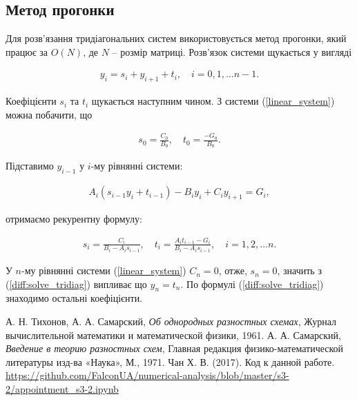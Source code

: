 \subsection{Метод прогонки}

Для розв'язання тридіагональних систем використовується метод прогонки, який працює за \(O(N)\), де \( N \) -- розмір матриці. Розв'язок системи щукається у вигляді

\begin{equation}
\begin{multlined} \label{diff:solve_tridiag}
y_i = s_i + y_{i+1} + t_i, \quad i = 0, 1, \dots n-1.
\end{multlined}
\end{equation}

Коефіцієнти \(s_i\) та \(t_i\) щукається наступним чином. З системи (\ref{linear_system}) можна побачити, що

\begin{equation}
\begin{multlined} 
s_0 = \frac{C_0}{B_0}, \quad t_0 = \frac{-G_0}{B_0}.
\end{multlined}
\end{equation}

Підставимо \( y_{i-1} \) у \(i\)-му рівнянні системи:

\begin{equation}
\begin{multlined} 
A_i\left(s_{i-1}y_i + t_{i-1}\right) - B_i y_i + C_iy_{i+1} = G_i,
\end{multlined}
\end{equation}

отримаємо рекурентну формулу:

\begin{equation}
\begin{multlined} 
s_i = \frac{C_i}{B_i-A_is_{i-1}}, \quad t_i = \frac{A_it_{i-1}-G_i}{B_i-A_is_{i-1}}, \quad i = 1, 2, \dots n.
\end{multlined}
\end{equation}

У \(n\)-му рівнянні системи (\ref{linear_system}) \(C_n = 0\), отже, \(s_n = 0\), значить з (\ref{diff:solve_tridiag}) випливає що \(y_n = t_n\). По формулі (\ref{diff:solve_tridiag}) знаходимо остальні коефіцієнти.

\begin{thebibliography}{9}

  А. Н. Тихонов, А. А. Самарский,
  \emph{Об однородных разностных схемах},
  Журнал вычислительной математики и математической физики, 1961.
  А. А. Самарский,
  \emph{Введение в теорию разностных схем},
  Главная редакция физико-математической литературы изд-ва «Наука», 
  М., 1971. 
  Чан Х. В. (2017). Код к данной работе.
  \url{https://github.com/FalconUA/numerical-analysis/blob/master/s3-2/appointment_s3-2.ipynb}

\end{thebibliography}
